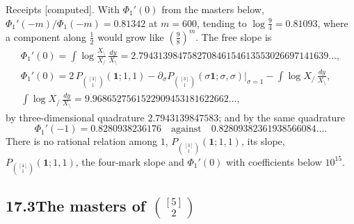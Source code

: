 \documentclass[11pt]{article}
\newcommand{\one}{\mathbf 1}
\newcommand{\Pth}{P_{\binom{[3]}1}(\one;1,1)}
\newcommand{\Pfour}{P_{\binom{[4]}1}(\one;1,1)}
\theoremstyle{plain}
\theoremstyle{definition}
\theoremstyle{remark}
\newcommand{\computed}{\textup{[computed]}}
\begin{document}
\noindent Receipts \computed. With $\Phi_1'(0)$ from the masters below, $\Phi_1'(-m)/\Phi_1(-m)=0.81342$ at $m=600$, tending to $\log\frac94=0.81093$, where a component along $\frac12$ would grow like $(\frac98)^m$. The free slope is
\begin{gather*}
\Phi_1'(0)=\int\log\frac{X_{\setminus}}{X_{/}}\,\frac{dy}{X_{\setminus}}=2.794313984758270846154613553026697141639\ldots,\\
\Phi_1'(0)=2\,\Pth-\partial_\sigma P_{\binom{[3]}1}(\sigma\one;\sigma,\sigma)\big|_{\sigma=1}-\int\log X_{/}\,\frac{dy}{X_{\setminus}},\\
\int\log X_{/}\,\frac{dy}{X_{\setminus}}=9.9686527561522909453181622662\ldots,
\end{gather*}
by three-dimensional quadrature $2.7943139847583$; and by the same quadrature
\[
\Phi_1'(-1)=0.8280938236176\quad\text{against}\quad0.82809382361938566084\ldots .
\]
There is no rational relation among $1$, $\Pth$, its slope, $\Pfour$, the four-mark slope and $\Phi_1'(0)$ with coefficients below $10^{15}$.

\subsection*{17.3\quad The masters of $\binom{[5]}2$}
\end{document}

